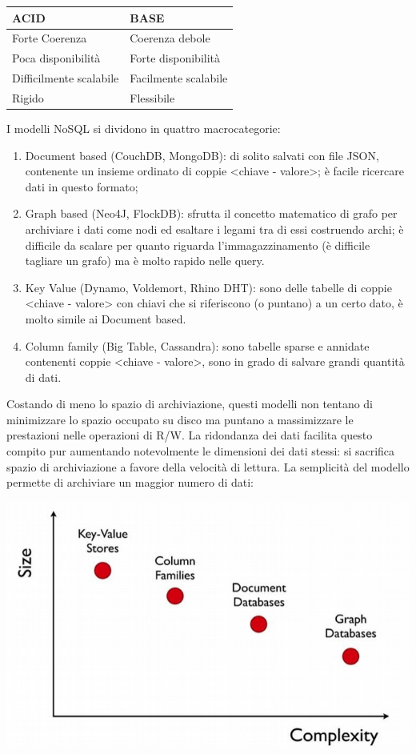\documentclass[a4page, 11pt]{article}
\begin{document}
\begin{center}
\begin{tabular}{l|l}
ACID & BASE \\
\hline
Forte Coerenza & Coerenza debole \\
Poca disponibilità & Forte disponibilità \\
Difficilmente scalabile & Facilmente scalabile\\
Rigido & Flessibile \\
\end{tabular}
\end{center}

I modelli NoSQL si dividono in quattro macrocategorie\cite{NoSQLDB, GraphDB}:
\begin{enumerate}[noitemsep]
\item Document based (CouchDB, MongoDB): di solito salvati con file JSON, contenente un insieme ordinato di coppie \textless{}chiave - valore\textgreater{}; è facile ricercare dati in questo formato;
\item Graph based (Neo4J, FlockDB): sfrutta il concetto matematico di grafo per archiviare i dati come nodi ed esaltare i legami tra di essi costruendo archi; è difficile da scalare per quanto riguarda l'immagazzinamento (è difficile tagliare un grafo) ma è molto rapido nelle query.
\item Key Value (Dynamo, Voldemort, Rhino DHT): sono delle tabelle di coppie \textless{}chiave - valore\textgreater{} con chiavi che si riferiscono (o puntano) a un certo dato, è molto simile ai Document based.
\item Column family (Big Table, Cassandra): sono tabelle sparse e annidate contenenti coppie \textless{}chiave - valore\textgreater{}, sono in grado di salvare grandi quantità di dati.
\end{enumerate}

Costando di meno lo spazio di archiviazione, questi modelli non tentano di minimizzare lo spazio occupato su disco ma puntano a massimizzare le prestazioni nelle operazioni di R/W.
La ridondanza dei dati facilita questo compito pur aumentando notevolmente le dimensioni dei dati stessi: si sacrifica spazio di archiviazione a favore della velocità di lettura.
La semplicità del modello permette di archiviare un maggior numero di dati:
\begin{center}
	\includegraphics[scale=0.4]{IMAGE1.jpg}
\end{center}
\end{document}

